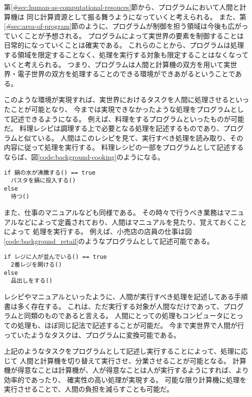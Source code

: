 第\ref{#sec:human-as-computational-resouces}節から、プログラムにおいて人間と計算機は
同じ計算資源として振る舞うようになっていくと考えられる。
また、第\ref{#sec:area-of-program}節のように、プログラムが制御を担う領域は今後も広がっていくことが予想される。
プログラムによって実世界の要素を制御することは日常的になっていくことは確実である。
これらのことから、プログラムは処理する領域を限定することなく、処理を実行する対象も限定することはなくなっていくと考えられる。
つまり、プログラムは人間と計算機の双方を用いて実世界・電子世界の双方を処理することのできる環境ができあがるということである。

このような環境が実現すれば、実世界におけるタスクを人間に処理させるといったことが可能となり、
今までは実現できなかったような処理をプログラムとして記述できるようになる。
例えば、料理をするプログラムといったものが可能だ。
料理レシピは調理する上で必要となる処理を記述するものであり、プログラムと似ている。
人間はこのレシピを見て、実行すべき処理を読み取り、その内容に従って処理を実行する。
料理レシピの一部をプログラムとして記述するならば、図\ref{code:background-cooking}のようになる。

\begin{lstlisting}[caption=料理レシピの一部をプログラム風に記述する, label=code:background-cooking]
if 鍋の水が沸騰する() == true
  パスタを鍋に投入する()
else
  待つ()
\end{lstlisting}

また、仕事のマニュアルなども同様である。
その時々で行うべき業務はマニュアルなどによって定義されており、人間はマニュアルを見たり、覚えておくことによって
処理を実行する。
例えば、小売店の店員の仕事は図\ref{code:background_retail}のようなプログラムとして記述可能である。

\begin{lstlisting}[caption=小売店の店員の挙動の一部をプログラム風に記述する, label=code:background-retail]
if レジに人が並んでいる() == true
  2番レジを開ける()
else
  品出しをする()
\end{lstlisting}

レシピやマニュアルといったように、人間が実行すべき処理を記述してある手順書は多く存在する。
これは、ただ実行する対象が人間なだけであって、プログラムと同類のものであると言える。
人間にとっての処理もコンピュータにとっての処理も、ほぼ同じ記法で記述することが可能だ。
今まで実世界で人間が行っていたようなタスクは、プログラムに変換可能である。

上記のようなタスクをプログラムとして記述し実行することによって、処理に応じて
人間と計算機を切り替えて実行させ、分業させることが可能となる。
計算機が得意なことは計算機が、人が得意なことは人が実行するようにすれば、より効率的であったり、
確実性の高い処理が実現する。
可能な限り計算機に処理を実行させることで、人間の負担を減らすことも可能だ。

